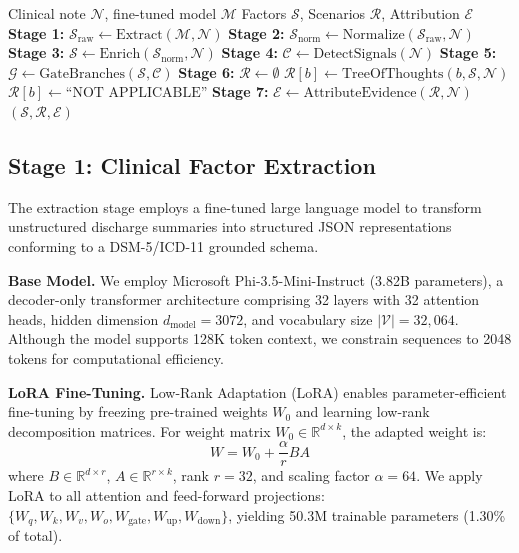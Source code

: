 \documentclass[conference]{IEEEtran}
\begin{document}
\begin{algorithm}[h]
\caption{Complete Pipeline Procedure}
\label{alg:pipeline}
\begin{algorithmic}[1]
\REQUIRE Clinical note $\mathcal{N}$, fine-tuned model $\mathcal{M}$
\ENSURE Factors $\mathcal{S}$, Scenarios $\mathcal{R}$, Attribution $\mathcal{E}$
\STATE \textbf{Stage 1:} $\mathcal{S}_{\text{raw}} \leftarrow \text{Extract}(\mathcal{M}, \mathcal{N})$
\STATE \textbf{Stage 2:} $\mathcal{S}_{\text{norm}} \leftarrow \text{Normalize}(\mathcal{S}_{\text{raw}}, \mathcal{N})$
\STATE \textbf{Stage 3:} $\mathcal{S} \leftarrow \text{Enrich}(\mathcal{S}_{\text{norm}}, \mathcal{N})$
\STATE \textbf{Stage 4:} $\mathcal{C} \leftarrow \text{DetectSignals}(\mathcal{N})$
\STATE \textbf{Stage 5:} $\mathcal{G} \leftarrow \text{GateBranches}(\mathcal{S}, \mathcal{C})$
\STATE \textbf{Stage 6:} $\mathcal{R} \leftarrow \emptyset$
        \STATE $\mathcal{R}[b] \leftarrow \text{TreeOfThoughts}(b, \mathcal{S}, \mathcal{N})$
    \ELSE
        \STATE $\mathcal{R}[b] \leftarrow \text{``NOT APPLICABLE''}$
    \ENDIF
\ENDFOR
\STATE \textbf{Stage 7:} $\mathcal{E} \leftarrow \text{AttributeEvidence}(\mathcal{R}, \mathcal{N})$
\RETURN $(\mathcal{S}, \mathcal{R}, \mathcal{E})$
\end{algorithmic}
\end{algorithm}

\subsection{Stage 1: Clinical Factor Extraction}

The extraction stage employs a fine-tuned large language model to transform unstructured discharge summaries into structured JSON representations conforming to a DSM-5/ICD-11 grounded schema.

\textbf{Base Model.} We employ Microsoft Phi-3.5-Mini-Instruct (3.82B parameters), a decoder-only transformer architecture comprising 32 layers with 32 attention heads, hidden dimension $d_{\text{model}} = 3072$, and vocabulary size $|\mathcal{V}| = 32{,}064$. Although the model supports 128K token context, we constrain sequences to 2048 tokens for computational efficiency.

\textbf{LoRA Fine-Tuning.} Low-Rank Adaptation (LoRA) \cite{b19} enables parameter-efficient fine-tuning by freezing pre-trained weights $W_0$ and learning low-rank decomposition matrices. For weight matrix $W_0 \in \mathbb{R}^{d \times k}$, the adapted weight is:
\begin{equation}
    W = W_0 + \frac{\alpha}{r} BA
\end{equation}
where $B \in \mathbb{R}^{d \times r}$, $A \in \mathbb{R}^{r \times k}$, rank $r = 32$, and scaling factor $\alpha = 64$. We apply LoRA to all attention and feed-forward projections: $\{W_q, W_k, W_v, W_o, W_{\text{gate}}, W_{\text{up}}, W_{\text{down}}\}$, yielding 50.3M trainable parameters (1.30\% of total).
\end{document}
